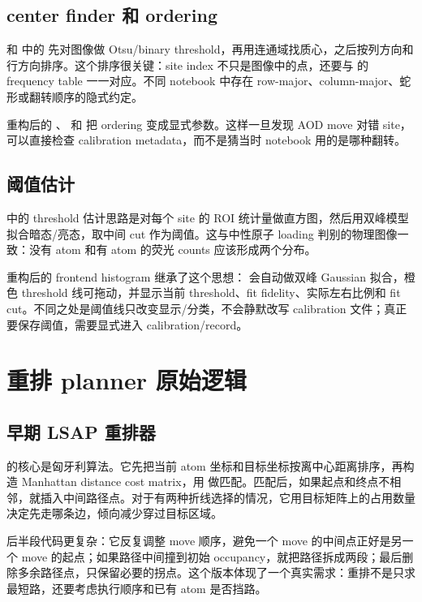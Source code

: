 \documentclass[11pt,oneside,openany]{book}
\begin{document}
\section{center finder 和 ordering}
 和  中的  先对图像做 Otsu/binary threshold，再用连通域找质心，之后按列方向和行方向排序。这个排序很关键：site index 不只是图像中的点，还要与  的 frequency table 一一对应。不同 notebook 中存在 row-major、column-major、蛇形或翻转顺序的隐式约定。

重构后的 、 和  把 ordering 变成显式参数。这样一旦发现 AOD move 对错 site，可以直接检查 calibration metadata，而不是猜当时 notebook 用的是哪种翻转。

\section{阈值估计}
 中的 threshold 估计思路是对每个 site 的 ROI 统计量做直方图，然后用双峰模型拟合暗态/亮态，取中间 cut 作为阈值。这与中性原子 loading 判别的物理图像一致：没有 atom 和有 atom 的荧光 counts 应该形成两个分布。

重构后的 frontend histogram 继承了这个思想： 会自动做双峰 Gaussian 拟合，橙色 threshold 线可拖动，并显示当前 threshold、fit fidelity、实际左右比例和 fit cut。不同之处是阈值线只改变显示/分类，不会静默改写 calibration 文件；真正要保存阈值，需要显式进入 calibration/record。

\chapter{重排 planner 原始逻辑}
\section{早期 LSAP 重排器}
 的核心是匈牙利算法。它先把当前 atom 坐标和目标坐标按离中心距离排序，再构造 Manhattan distance cost matrix，用  做匹配。匹配后，如果起点和终点不相邻，就插入中间路径点。对于有两种折线选择的情况，它用目标矩阵上的占用数量决定先走哪条边，倾向减少穿过目标区域。

后半段代码更复杂：它反复调整 move 顺序，避免一个 move 的中间点正好是另一个 move 的起点；如果路径中间撞到初始 occupancy，就把路径拆成两段；最后删除多余路径点，只保留必要的拐点。这个版本体现了一个真实需求：重排不是只求最短路，还要考虑执行顺序和已有 atom 是否挡路。
\end{document}
